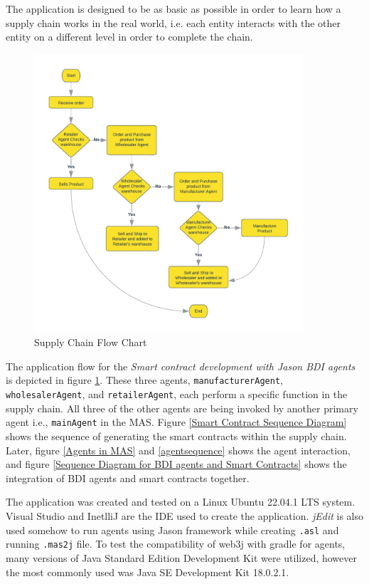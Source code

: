 The application is designed to be as basic as possible in order to learn how a supply chain works in the real world, i.e. each entity interacts with the other entity on a different level in order to complete the chain.

    \begin{figure}[h]
    \centering
      \includegraphics[width=10cm]{includes/figures/Flow Chart.png}
      \caption{Supply Chain Flow Chart}
      \label{Flow chart}
    \end{figure}

\vspace{.5cm}

The application flow for the \textit{Smart contract development with Jason \ac{BDI} agents} is depicted in figure \ref{Flow chart}. These three agents, \texttt{manufacturerAgent}, \texttt{wholesalerAgent}, and \texttt{retailerAgent}, each perform a specific function in the supply chain. All three of the other agents are being invoked by another primary agent i.e., \texttt{mainAgent} in the \ac{MAS}. Figure 
 \ref{Smart Contract Sequence Diagram}  shows the sequence of generating the smart contracts within the supply chain.
Later, figure \ref{Agents in MAS} and \ref{agentsequence} shows the agent interaction, and figure \ref{Sequence Diagram for BDI agents and Smart Contracts} shows the integration of \ac{BDI} agents and smart contracts together.

\vspace{.5cm}

The application was created and tested on a Linux Ubuntu 22.04.1 LTS system.
Visual Studio and InetlliJ are the \ac{IDE} used to create the application. \textit{jEdit} is also used somehow to run agents using Jason framework while creating \texttt{.asl} and running \texttt{.mas2j} file.
To test the compatibility of web3j with gradle for agents, many versions of Java Standard Edition Development Kit were utilized, however the most commonly used was Java SE Development Kit 18.0.2.1. 

